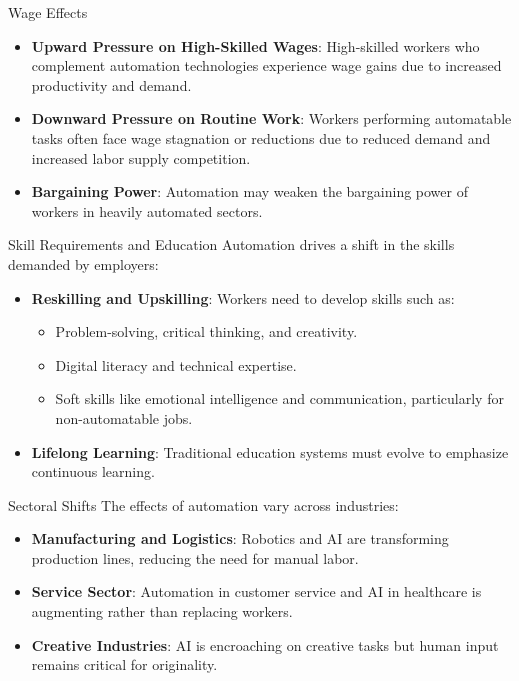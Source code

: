 \documentclass{beamer}
\begin{document}
\begin{frame}{Wage Effects}
\begin{itemize}
    \item \textbf{Upward Pressure on High-Skilled Wages}: High-skilled workers who complement automation technologies experience wage gains due to increased productivity and demand.
    \vspace{0.5cm}
    \item \textbf{Downward Pressure on Routine Work}: Workers performing automatable tasks often face wage stagnation or reductions due to reduced demand and increased labor supply competition.
    \vspace{0.5cm}
    \item \textbf{Bargaining Power}: Automation may weaken the bargaining power of workers in heavily automated sectors.
\end{itemize}
\end{frame}

\begin{frame}{Skill Requirements and Education}
Automation drives a shift in the skills demanded by employers:
\vspace{0.5cm}
\begin{itemize}
    \item \textbf{Reskilling and Upskilling}: Workers need to develop skills such as:
    \begin{itemize}
        \item Problem-solving, critical thinking, and creativity.
        \item Digital literacy and technical expertise.
        \item Soft skills like emotional intelligence and communication, particularly for non-automatable jobs.
    \end{itemize}
    \vspace{0.5cm}
    \item \textbf{Lifelong Learning}: Traditional education systems must evolve to emphasize continuous learning.
\end{itemize}
\end{frame}

\begin{frame}{Sectoral Shifts}
The effects of automation vary across industries:
\vspace{0.5cm}
\begin{itemize}
    \item \textbf{Manufacturing and Logistics}: Robotics and AI are transforming production lines, reducing the need for manual labor.
    \vspace{0.5cm}
    \item \textbf{Service Sector}: Automation in customer service and AI in healthcare is augmenting rather than replacing workers.
    \vspace{0.5cm}
    \item \textbf{Creative Industries}: AI is encroaching on creative tasks but human input remains critical for originality.
\end{itemize}
\end{frame}
\end{document}
